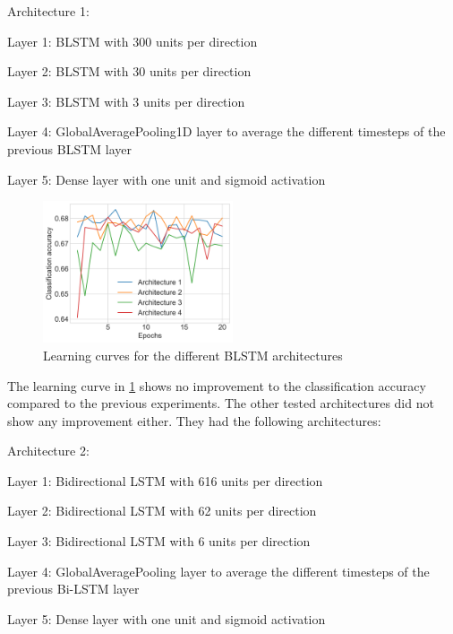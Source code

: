 Architecture 1:
\begin{addmargin}[1em]{1em}
    \begin{description}
        \item Layer 1: \acl{BLSTM} with 300 units per direction
        \item Layer 2: \acl{BLSTM} with 30 units per direction
        \item Layer 3: \acl{BLSTM} with 3 units per direction
        \item Layer 4: GlobalAveragePooling1D layer to average the different timesteps of the previous \ac{BLSTM} layer
        \item Layer 5: Dense layer with one unit and sigmoid activation
    \end{description}
\end{addmargin}
\begin{figure}[h]
    \centering
    \includegraphics[width=0.5\textwidth]{figures/charts/lstm_learning_curve.png}
    \caption{Learning curves for the different \acl{BLSTM} architectures}
    \label{figure:lstm_learning}
\end{figure}
The learning curve in \ref{figure:lstm_learning} shows no improvement to the classification accuracy compared to the previous experiments.
The other tested architectures did not show any improvement either.
They had the following architectures:

Architecture 2:
\begin{addmargin}[1em]{0em}
    \begin{description}
        \item Layer 1: Bidirectional LSTM with 616 units per direction
        \item Layer 2: Bidirectional LSTM with 62 units per direction
        \item Layer 3: Bidirectional LSTM with 6 units per direction
        \item Layer 4: GlobalAveragePooling layer to average the different timesteps of the previous Bi-LSTM layer
        \item Layer 5: Dense layer with one unit and sigmoid activation
    \end{description}
\end{addmargin}


